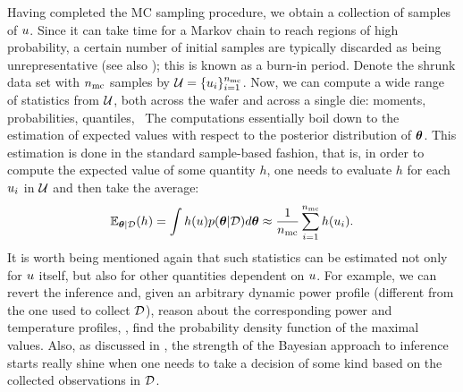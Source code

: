 Having completed the MC sampling procedure, we obtain a collection of samples of $u$. Since it can take time for a Markov chain to reach regions of high probability, a certain number of initial samples are typically discarded as being unrepresentative (see also ); this is known as a burn-in period. Denote the shrunk data set with ${n_\text{mc}}$ samples by $\mathcal{U} = \{ u_i \}_{i = 1}^{n_\text{mc}}$. Now, we can compute a wide range of statistics from $\mathcal{U}$, both across the wafer and across a single die: moments, probabilities, quantiles, \etc\ The computations essentially boil down to the estimation of expected values with respect to the posterior distribution of ${\boldsymbol\theta}$. This estimation is done in the standard sample-based fashion, that is, in order to compute the expected value of some quantity $h$, one needs to evaluate $h$ for each $u_i$ in $\mathcal{U}$ and then take the average:
\[
  \E_{\vparam | \Data}(h) = \int h(\u) \f{\vparam | \Data} d\vparam \approx \frac{1}{\nsamples} \sum_{i = 1}^\nsamples h(\u_i).
\]
It is worth being mentioned again that such statistics can be estimated not only for $u$ itself, but also for other quantities dependent on $u$. For example, we can revert the inference and, given an arbitrary dynamic power profile (different from the one used to collect $\mathcal{D}$), reason about the corresponding power and temperature profiles, \eg, find the probability density function of the maximal values. Also, as discussed in , the strength of the Bayesian approach to inference starts really shine when one needs to take a decision of some kind based on the collected observations in $\mathcal{D}$.
